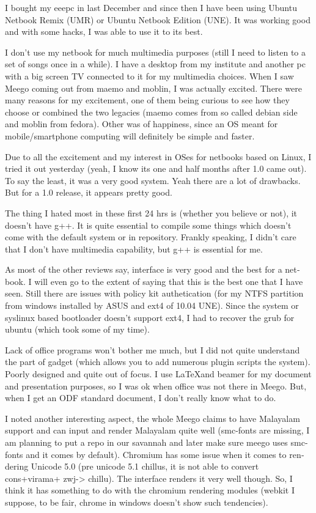 \begin{english}
\vskip 2pt
I bought my eeepc in last December and since then I have been using Ubuntu Netbook Remix (UMR) or Ubuntu Netbook Edition (UNE). 
It was working good and with some hacks, I was able to use it to its best.

I don't use my netbook for much multimedia purposes (still I need to listen to a set of songs once in a while). 
I have a desktop from my institute and another pc with a big screen TV connected to it for my multimedia choices. 
When I saw Meego coming out from maemo and moblin, I was actually excited. There were many reasons for my excitement, 
one of them being curious to see how they choose or combined the two legacies (maemo comes from so called debian side and moblin from fedora).
Other was of happiness, since an OS meant for mobile/smartphone computing will definitely be simple and faster.

Due to all the excitement and my interest in OSes for netbooks based on Linux, I tried it out yesterday (yeah, I know its one and half months after 1.0 came out). To say the least, it was a very good system. 
Yeah there are a lot of drawbacks. But for a 1.0 release, it appears pretty good.

The thing I hated most in these first 24 hrs is (whether you believe or not), it doesn’t have g++. 
It is quite essential to compile some things which doesn’t come with the default system or in repository. 
Frankly speaking, I didn’t care that I don’t have multimedia capability, but g++ is essential for me.

As most of the other reviews say, interface is very good and the best for a netbook. I will even go to the extent of saying that this is the best one that I have seen. Still there are issues with policy kit authetication (for my NTFS partition from windows 
installed by ASUS and ext4 of 10.04 UNE). Since the system or syslinux based bootloader doesn’t support ext4, 
I had to recover the grub for ubuntu (which took some of my time).

Lack of office programs won't bother me much, but I did not quite understand the part of gadget (which allows you to add numerous 
plugin scripts the system). Poorly designed and quite out of focus. I use \LaTeX and beamer for my document and presentation 
purposes, so I was ok when office was not there in Meego. But, when I get an ODF standard document, 
I don’t really know what to do.

I noted another interesting aspect, the whole Meego claims to have Malayalam support and can input and render 
Malayalam quite well (smc-fonts are missing, I am planning to put a repo in our savannah and later make sure 
meego uses smc-fonts and it comes by default). Chromium has some issue when it comes to rendering Unicode 
5.0 (pre unicode 5.1 chillus, it is not able to convert cons+virama+ zwj-> chillu). 
The interface renders it very well though. So, I think it has something to do with the chromium 
rendering modules (webkit I suppose, to be fair, chrome in windows doesn’t show such tendencies).


\end{english}
